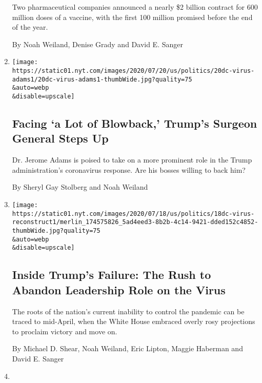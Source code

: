 \begin{enumerate}
  Two pharmaceutical companies announced a nearly \$2 billion contract
  for 600 million doses of a vaccine, with the first 100 million
  promised before the end of the year.

  By Noah Weiland, Denise Grady and David E. Sanger
\item
  \href{/2020/07/21/us/politics/jerome-adams-surgeon-general-trump-coronavirus.html}{}

  \texttt{[image: https://static01.nyt.com/images/2020/07/20/us/politics/20dc-virus-adams1/20dc-virus-adams1-thumbWide.jpg?quality=75\\\&auto=webp\\\&disable=upscale]}

  \hypertarget{facing-a-lot-of-blowback-trumps-surgeon-general-steps-up}{%
  \subsection{Facing `a Lot of Blowback,' Trump's Surgeon General Steps
  Up}\label{facing-a-lot-of-blowback-trumps-surgeon-general-steps-up}}

  Dr. Jerome Adams is poised to take on a more prominent role in the
  Trump administration's coronavirus response. Are his bosses willing to
  back him?

  By Sheryl Gay Stolberg and Noah Weiland
\item
  \href{/2020/07/18/us/politics/trump-coronavirus-response-failure-leadership.html}{}

  \texttt{[image: https://static01.nyt.com/images/2020/07/18/us/politics/18dc-virus-reconstruct1/merlin\_174575826\_5ad4eed3-8b2b-4c14-9421-dded152c4852-thumbWide.jpg?quality=75\\\&auto=webp\\\&disable=upscale]}

  \hypertarget{inside-trumps-failure-the-rush-to-abandon-leadership-role-on-the-virus}{%
  \subsection{Inside Trump's Failure: The Rush to Abandon Leadership
  Role on the
  Virus}\label{inside-trumps-failure-the-rush-to-abandon-leadership-role-on-the-virus}}

  The roots of the nation's current inability to control the pandemic
  can be traced to mid-April, when the White House embraced overly rosy
  projections to proclaim victory and move on.

  By Michael D. Shear, Noah Weiland, Eric Lipton, Maggie Haberman and
  David E. Sanger
\item
  \href{/2020/07/17/us/politics/medicare-agency-inspector-general.html}{}


\end{enumerate}
